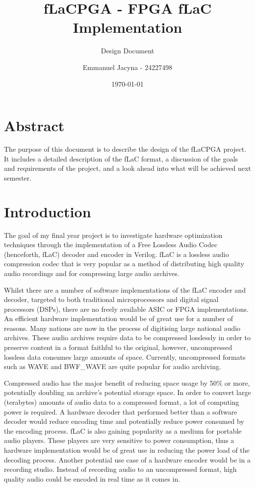 \documentclass[12pt]{scrartcl}
\title{fLaCPGA - FPGA fLaC Implementation}
\subtitle{Design Document}
\author{Emmanuel Jacyna - 24227498}
\date{\today}
\begin{document}
\pagestyle{myheadings}
  \maketitle
  \tableofcontents
  
  \section*{Abstract}
  The purpose of this document is to describe the design of the fLaCPGA project. It includes a detailed description of the fLaC format, a discussion of the goals and requirements of the project, and a look ahead into what will be achieved next semester.
  
  
  \section{Introduction}
  The goal of my final year project is to investigate hardware optimization techniques through the implementation of a Free Lossless Audio Codec (henceforth, fLaC) decoder and encoder in Verilog. fLaC is a lossless audio compression codec that is very popular as a method of distributing high quality audio recordings and for compressing large audio archives\cite{flac_popular}. 
  
  Whilst there are a number of software implementations of the fLaC encoder and decoder, targeted to both traditional microprocessors and digital signal processors (DSPs), there are no freely available ASIC or FPGA implementations. An efficient hardware implementation would be of great use for a number of reasons. Many nations are now in the process of digitising large national audio archives. These audio archives require data to be compressed losslessly in order to preserve content in a format faithful to the original, however, uncompressed lossless data consumes large amounts of space. Currently, uncompressed formats such as WAVE and BWF\_WAVE are quite popular for audio archiving\cite{pres_fmts}. 
  
  Compressed audio has the major benefit of reducing space usage by 50\% or more, potentially doubling an archive's potential storage space. In order to convert large (terabytes) amounts of audio data to a compressed format, a lot of computing power is required. A hardware decoder that performed better than a software decoder would reduce encoding time and potentially reduce power consumed by the encoding process. fLaC is also gaining popularity as a medium for portable audio players. These players are very sensitive to power consumption, thus a hardware implementation would be of great use in reducing the power load of the decoding process. Another potential use case of a hardware encoder would be in a recording studio. Instead of recording audio to an uncompressed format, high quality audio could be encoded in real time as it comes in.
  
\end{document}
